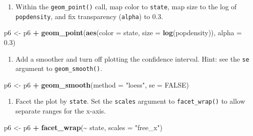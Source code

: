 \documentclass[
]{book}
\newenvironment{Shaded}{\begin{snugshade}}{\end{snugshade}}
\newcommand{\DataTypeTok}[1]{\textcolor[rgb]{0.13,0.29,0.53}{#1}}
\newcommand{\FloatTok}[1]{\textcolor[rgb]{0.00,0.00,0.81}{#1}}
\newcommand{\KeywordTok}[1]{\textcolor[rgb]{0.13,0.29,0.53}{\textbf{#1}}}
\newcommand{\NormalTok}[1]{#1}
\newcommand{\OperatorTok}[1]{\textcolor[rgb]{0.81,0.36,0.00}{\textbf{#1}}}
\newcommand{\OtherTok}[1]{\textcolor[rgb]{0.56,0.35,0.01}{#1}}
\newcommand{\StringTok}[1]{\textcolor[rgb]{0.31,0.60,0.02}{#1}}
\providecommand{\tightlist}{%
  \setlength{\itemsep}{0pt}\setlength{\parskip}{0pt}}
\begin{document}
\begin{alert}
\begin{enumerate}
\def\labelenumi{\arabic{enumi}.}
\setcounter{enumi}{1}
\tightlist
\item
  Within the \texttt{geom\_point()} call, map color to \texttt{state}, map size to the log of \texttt{popdensity}, and fix transparency (\texttt{alpha}) to 0.3.
\end{enumerate}

\begin{Shaded}
\begin{Highlighting}[]
\NormalTok{p6 \textless{}{-}}\StringTok{ }\NormalTok{p6 }\OperatorTok{+}\StringTok{ }\KeywordTok{geom\_point}\NormalTok{(}\KeywordTok{aes}\NormalTok{(}\DataTypeTok{color =}\NormalTok{ state, }\DataTypeTok{size =} \KeywordTok{log}\NormalTok{(popdensity)), }\DataTypeTok{alpha =} \FloatTok{0.3}\NormalTok{) }
\end{Highlighting}
\end{Shaded}

\begin{enumerate}
\def\labelenumi{\arabic{enumi}.}
\setcounter{enumi}{2}
\tightlist
\item
  Add a smoother and turn off plotting the confidence interval. Hint: see the \texttt{se} argument to \texttt{geom\_smooth()}.
\end{enumerate}

\begin{Shaded}
\begin{Highlighting}[]
\NormalTok{p6 \textless{}{-}}\StringTok{ }\NormalTok{p6 }\OperatorTok{+}\StringTok{ }\KeywordTok{geom\_smooth}\NormalTok{(}\DataTypeTok{method =} \StringTok{"loess"}\NormalTok{, }\DataTypeTok{se =} \OtherTok{FALSE}\NormalTok{) }
\end{Highlighting}
\end{Shaded}

\begin{enumerate}
\def\labelenumi{\arabic{enumi}.}
\setcounter{enumi}{3}
\tightlist
\item
  Facet the plot by \texttt{state}. Set the \texttt{scales} argument to \texttt{facet\_wrap()} to allow separate ranges for the x-axis.
\end{enumerate}

\begin{Shaded}
\begin{Highlighting}[]
\NormalTok{p6 \textless{}{-}}\StringTok{ }\NormalTok{p6 }\OperatorTok{+}\StringTok{ }\KeywordTok{facet\_wrap}\NormalTok{(}\OperatorTok{\textasciitilde{}}\StringTok{ }\NormalTok{state, }\DataTypeTok{scales =} \StringTok{"free\_x"}\NormalTok{)}
\end{Highlighting}
\end{Shaded}


\end{alert}
\end{document}
